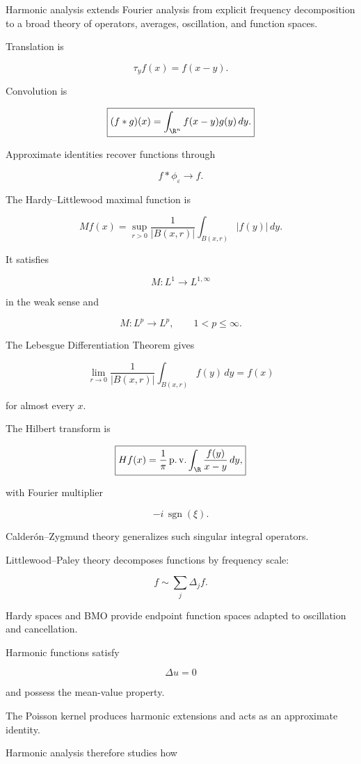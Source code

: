Harmonic analysis extends Fourier analysis from explicit frequency
decomposition to a broad theory of operators, averages, oscillation, and
function spaces.

Translation is

\[
\boxed{
\tau_yf(x)=f(x-y).
}
\]

Convolution is

\[
\boxed{
(f*g)(x)
=
\int_{\R^n}f(x-y)g(y)\,dy.
}
\]

Approximate identities recover functions through

\[
\boxed{
f*\phi_\varepsilon\to f.
}
\]

The Hardy--Littlewood maximal function is

\[
\boxed{
Mf(x)
=
\sup_{r>0}
\frac1{|B(x,r)|}
\int_{B(x,r)}|f(y)|\,dy.
}
\]

It satisfies

\[
\boxed{
M:L^1\to L^{1,\infty}
}
\]

in the weak sense and

\[
\boxed{
M:L^p\to L^p,
\qquad
1<p\leq\infty.
}
\]

The Lebesgue Differentiation Theorem gives

\[
\boxed{
\lim_{r\to0}
\frac1{|B(x,r)|}
\int_{B(x,r)}f(y)\,dy
=
f(x)
}
\]

for almost every \(x\).

The Hilbert transform is

\[
\boxed{
Hf(x)
=
\frac1\pi
\operatorname{p.v.}
\int_{\R}
\frac{f(y)}{x-y}\,dy,
}
\]

with Fourier multiplier

\[
\boxed{
-i\,\operatorname{sgn}(\xi).
}
\]

Calder\'on--Zygmund theory generalizes such singular integral operators.

Littlewood--Paley theory decomposes functions by frequency scale:

\[
\boxed{
f\sim\sum_j\Delta_jf.
}
\]

Hardy spaces and BMO provide endpoint function spaces adapted to
oscillation and cancellation.

Harmonic functions satisfy

\[
\boxed{
\Delta u=0
}
\]

and possess the mean-value property.

The Poisson kernel produces harmonic extensions and acts as an
approximate identity.

Harmonic analysis therefore studies how

